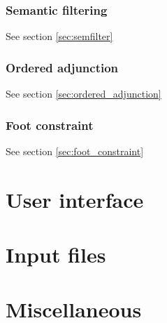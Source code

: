 \documentclass[a4paper,11pt]{report}
\begin{document}
\section{Semantic filtering}

See section \ref{sec:semfilter}

\section{Ordered adjunction}

See section \ref{sec:ordered_adjunction}

\section{Foot constraint}

See section \ref{sec:foot_constraint}

\part{User interface}






\part{Input files}




%
%

\part{Miscellaneous}




{


}
\end{document}
